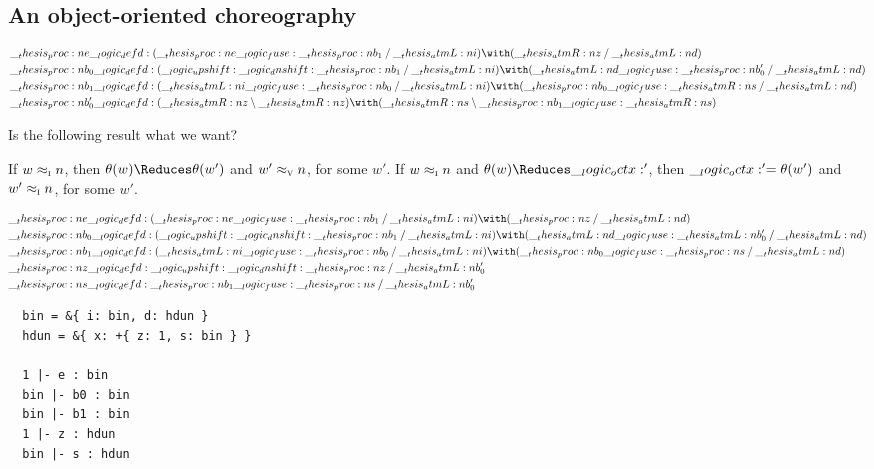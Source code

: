 \subsection{An object-oriented choreography}

\begin{equation*}
  \begin{lgathered}
    \proc{e} \defd (\proc{e} \fuse \proc{b}_1 \pmir \atmL{i}) \with (\atmR{z} \pmir \atmL{d}) \\
    \proc{b}_0 \defd (\up \dn \proc{b}_1 \pmir \atmL{i}) \with (\atmL{d} \fuse \proc{b}'_0 \pmir \atmL{d}) \\
    \proc{b}_1 \defd (\atmL{i} \fuse \proc{b}_0 \pmir \atmL{i}) \with (\proc{b}_0 \fuse \atmR{s} \pmir \atmL{d}) \\
    \proc{b}'_0 \defd (\atmR{z} \limp \atmR{z}) \with (\atmR{s} \limp \proc{b}_1 \fuse \atmR{s})
  \end{lgathered}
\end{equation*}


Is the following result what we want?
\begin{corollary}
  If $w \approx\sb{\text{\normalfont\scshape i}} n$, then $\theta(w) \Reduces \theta(w')$ and $w' \approx\sb{\text{\normalfont\scshape v}} n$, for some $w'$.
  If $w \approx\sb{\text{\normalfont\scshape i}} n$ and $\theta(w) \Reduces \octx'$, then $\__logic_octx:' = \theta(w')$ and $w' \approx\sb{\text{\normalfont\scshape i}} n$, for some $w'$.
\end{corollary}


\begin{equation*}
  \begin{lgathered}
    \proc{e} \defd (\proc{e} \fuse \proc{b}_1 \pmir \atmL{i}) \with (\proc{z} \pmir \atmL{d}) \\
    \proc{b}_0 \defd (\up \dn \proc{b}_1 \pmir \atmL{i}) \with (\atmL{d} \fuse \atmL{b}'_0 \pmir \atmL{d}) \\
    \proc{b}_1 \defd (\atmL{i} \fuse \proc{b}_0 \pmir \atmL{i}) \with (\proc{b}_0 \fuse \proc{s} \pmir \atmL{d}) \\
    \proc{z} \defd \up \dn \proc{z} \pmir \atmL{b}'_0 \\
    \proc{s} \defd \proc{b}_1 \fuse \proc{s} \pmir \atmL{b}'_0
  \end{lgathered}
\end{equation*}

\begin{verbatim}
  bin = &{ i: bin, d: hdun }
  hdun = &{ x: +{ z: 1, s: bin } }

  1 |- e : bin
  bin |- b0 : bin
  bin |- b1 : bin
  1 |- z : hdun
  bin |- s : hdun
\end{verbatim}

